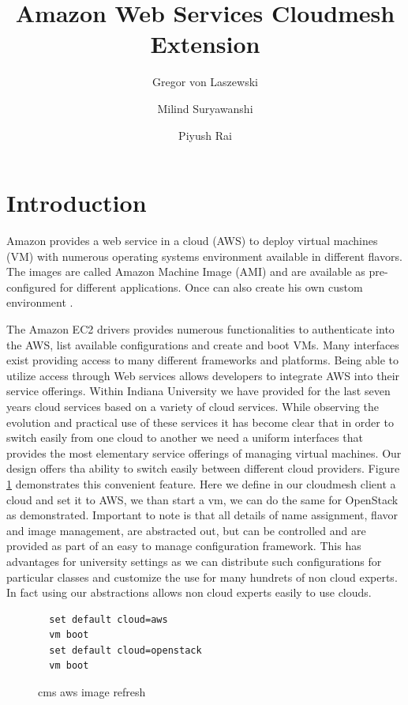 \documentclass[9pt,twocolumn,twoside]{../../styles/osajnl}
\title{Amazon Web Services Cloudmesh Extension}
\author[1]{Gregor von Laszewski}
\author[1]{Milind Suryawanshi}
\author[1]{Piyush Rai}
\affil[1]{School of Informatics and Computing, Bloomington, IN 47408, U.S.A.}
\begin{document}
\maketitle

\section{Introduction}

Amazon provides a web service in a cloud (AWS) to deploy
virtual machines (VM) with numerous operating systems environment
available in different flavors. The images are called Amazon Machine
Image (AMI) and are available as pre-configured for different
applications. Once can also create his own custom environment
\cite{www-amazon-ec2}.

The Amazon EC2 drivers provides numerous functionalities to
authenticate into the AWS, list available configurations and create
and boot VMs. Many interfaces exist providing access to many different
frameworks and platforms. Being able to utilize access through Web
services allows developers to integrate AWS into their service
offerings. Within Indiana University we have provided for the last
seven years cloud services based on a variety of cloud services.
While observing the evolution and practical use of these services it
has become clear that in order to switch easily from one cloud to
another we need a uniform interfaces that provides the most elementary
service offerings of managing virtual machines. Our design offers tha
ability to switch easily between different cloud providers. Figure
\ref{F:switch} demonstrates this convenient feature. Here we define in
our cloudmesh client a cloud and set it to AWS, we than start a vm, we
can do the same for OpenStack as demonstrated. Important to note is
that all details of name assignment, flavor and image management, are
abstracted out, but can be controlled and are provided as part of an
easy to manage configuration framework. This has advantages for
university settings as we can distribute such configurations for
particular classes and customize the use for many hundrets of non
cloud experts. In fact using our abstractions allows non cloud experts
easily to use clouds. 

\begin{figure}[htb]
  \centering
  \begin{verbatim}
  set default cloud=aws
  vm boot
  set default cloud=openstack
  vm boot 
  \end{verbatim}
  \vspace{-2.0\baselineskip}
  \caption{cms aws image refresh}
  \label{F:switch}
\end{figure}
		
\end{document}
